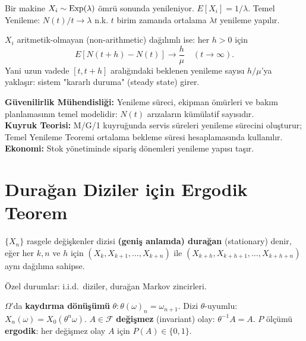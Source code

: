 \begin{ornek}
Bir makine $X_i \sim \operatorname{Exp}(\lambda)$ ömrü sonunda yenileniyor.
$E[X_i] = 1/\lambda$. Temel Yenileme: $N(t)/t \to \lambda$ n.k.
$t$ birim zamanda ortalama $\lambda t$ yenileme yapılır.
\end{ornek}

\begin{teorem}
\label{thm:blackwell}
$X_i$ aritmetik-olmayan (non-arithmetic) dağılımlı ise: her $h > 0$ için
\[
  E[N(t+h) - N(t)] \to \frac{h}{\mu} \quad (t \to \infty).
\]
Yani uzun vadede $[t, t+h]$ aralığındaki beklenen yenileme sayısı $h/\mu$'ya yaklaşır:
sistem "kararlı duruma" (steady state) girer.
\end{teorem}

\begin{disiplinlerarasibaglan}
\textbf{Güvenilirlik Mühendisliği:} Yenileme süreci, ekipman ömürleri ve
bakım planlamasının temel modelidir: $N(t)$ arızaların kümülatif sayısıdır.\\
\textbf{Kuyruk Teorisi:} M/G/1 kuyruğunda servis süreleri yenileme sürecini oluşturur;
Temel Yenileme Teoremi ortalama bekleme süresi hesaplamasında kullanılır.\\
\textbf{Ekonomi:} Stok yönetiminde sipariş dönemleri yenileme yapısı taşır.
\end{disiplinlerarasibaglan}

\section{Durağan Diziler için Ergodik Teorem}
\label{sec:ergodik_teorem}

\begin{tanim}
\label{def:duragan_dizi}
$\{X_n\}$ rasgele değişkenler dizisi \textbf{(geniş anlamda) durağan}
(stationary) denir, eğer her $k, n$ ve $h$ için
$(X_k, X_{k+1}, \ldots, X_{k+n})$ ile $(X_{k+h}, X_{k+h+1}, \ldots, X_{k+h+n})$
aynı dağılıma sahipse.

Özel durumlar: i.i.d.\ diziler, durağan Markov zincirleri.
\end{tanim}

\begin{tanim}
\label{def:ergodiklik}
$\Omega$'da \textbf{kaydırma dönüşümü} $\theta: \theta(\omega)_n = \omega_{n+1}$.
Dizi $\theta$-uyumlu: $X_n(\omega) = X_0(\theta^n \omega)$.
$A \in \mathcal{F}$ \textbf{değişmez} (invariant) olay: $\theta^{-1}A = A$.
$P$ ölçümü \textbf{ergodik}: her değişmez olay $A$ için $P(A) \in \{0,1\}$.
\end{tanim}


